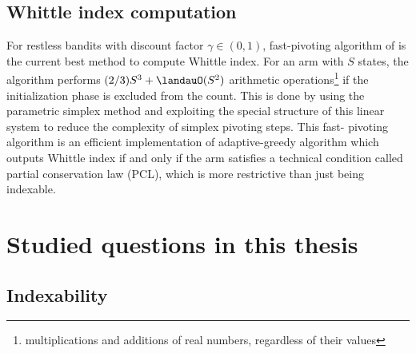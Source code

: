 
\subsection{Whittle index computation}

For restless bandits with discount factor $\gamma\in(0,1)$, fast-pivoting algorithm of \cite{nino2020fast} is the current best method to compute Whittle index.
For an arm with $S$ states, the algorithm performs $(2/3)S^3+\landauO(S^2)$ arithmetic operations\footnote{multiplications and additions of real numbers, regardless of their values} if the initialization phase is excluded from the count.
This is done by using the parametric simplex method and exploiting the special structure of this linear system to reduce the complexity of simplex pivoting steps. This fast- pivoting algorithm is an efficient implementation of adaptive-greedy algorithm \cite{nino2007dynamic} which outputs Whittle index if and only if the arm satisfies a technical condition called partial conservation law (PCL), which is more restrictive than just being indexable.


\section{Studied questions in this thesis}

\subsection{Indexability}

